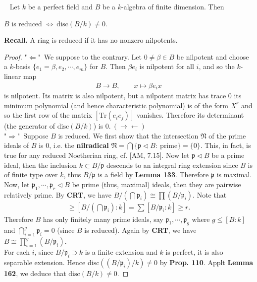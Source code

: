 \documentclass[12pt,a4paper,footinclude=true,headinclude=true]{scrbook} %
\newenvironment{lemma}[2][]
{\renewcommand\theinnercustomlemma{#2}\innercustomlemma[#1]
\begin{mdframed}[backgroundcolor=gray!20]\ }
{\end{mdframed}\endinnercustomprop}
\begin{document}
\begin{lemma}{163}
    Let $k$ be a perfect field and $B$ be a $k$-algebra of finite dimension. Then\\  \centerline{$B$ is reduced $\Longleftrightarrow\ \mathrm{disc}(B/k)\neq0$.}
\end{lemma}
\textbf{Recall.} A ring is reduced if it has no nonzero nilpotents.
\begin{proof}
    "$\Leftarrow$"\ We suppose to the contrary. Let $0\neq\beta\in B$ be nilpotent and choose a $k$-basis $\{e_1=\beta,e_2,\cdots,e_m\}$ for $B$. Then $\beta e_i$ is nilpotent for all $i$, and so the $k$-linear map 
    \begin{align*}
        B\longrightarrow B,\qquad x\longmapsto\beta e_ix
    \end{align*}
    is nilpotent. Its matrix is also nilpotent, but a nilpotent matrix has trace $0$ \textemdash its minimum polynomial (and hence characteristic polynomial) is of the form $X^r$ \textemdash and so the first row of the matrix $[\mathrm{Tr}(e_ie_j)]$ vanishes. Therefore its determinant (the generator of $\mathrm{disc}(B/k)$) is $0.\ (\to\gets)$\\
    "$\Rightarrow$"\ Suppose $B$ is reduced. We first show that the intersection $\mathfrak{N}$ of the prime ideals of $B$ is $0$, i.e. the \textbf{nilradical} $\mathfrak{N}=\bigcap\{\mathfrak{p}\triangleleft B:\ \text{prime}\}=\{0\}$.  This, in fact, is true for any reduced Noetherian ring, cf. [AM, 7.15]. Now let $\mathfrak{p}\triangleleft B$ be a prime ideal, then the inclusion $k\subset B/\mathfrak{p}$ descends to an integral ring extension since $B$ is of finite type over $k$, thus $B/\mathfrak{p}$ is a field by \textbf{Lemma 133}. Therefore $\mathfrak{p}$ is maximal. Now, let $\mathfrak{p}_1,\cdots,\mathfrak{p}_r \triangleleft B$ be prime (thus, maximal) ideals, then they are pairwise relatively prime. By \textbf{CRT}, we have $B/(\bigcap\mathfrak{p}_i)\cong \prod(B/\mathfrak{p}_i)$. Note that
    \begin{align*}
        [B:k]\geq[B/(\bigcap\mathfrak{p}_i):k]=\sum[B/\mathfrak{p}_i:k]\geq r.
    \end{align*}
    Therefore $B$ has only finitely many prime ideals, say $\mathfrak{p}_1,\cdots, \mathfrak{p}_g$ where $g\leq[B:k]$ and $\bigcap_{i=1}^g\mathfrak{p}_i=0$ (since $B$ is reduced). Again by \textbf{CRT}, we have $B\cong\prod_{i=1}^g (B/\mathfrak{p}_i)$.\\
    For each $i$, since $B/\mathfrak{p}_i\supset k$ is a finite extension and $k$ is perfect, it is also separable extension. Hence $\mathrm{disc}((B/ \mathfrak{p}_i)/k)\neq0$ by \textbf{Prop. 110}. Applt \textbf{Lemma 162}, we deduce that $\mathrm{disc}(B/k)\neq0$. 
\end{proof}
\end{document}
